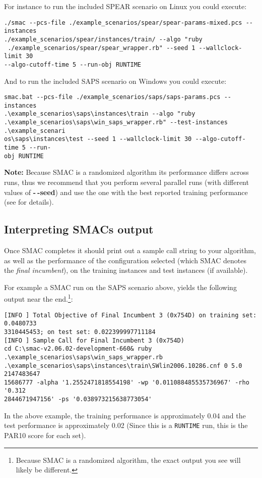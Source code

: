\documentclass[11pt,letterpaper,twoside]{article}
\begin{document}
For instance to run the included SPEAR scenario on Linux you could execute:

\begin{verbatim}
./smac --pcs-file ./example_scenarios/spear/spear-params-mixed.pcs --instances
./example_scenarios/spear/instances/train/ --algo "ruby 
 ./example_scenarios/spear/spear_wrapper.rb" --seed 1 --wallclock-limit 30
--algo-cutoff-time 5 --run-obj RUNTIME
\end{verbatim}

And to run the included SAPS scenario on Windows you could execute:

\begin{verbatim}
smac.bat --pcs-file ./example_scenarios/saps/saps-params.pcs --instances 
.\example_scenarios\saps\instances\train --algo "ruby
.\example_scenarios\saps\win_saps_wrapper.rb" --test-instances .\example_scenari
os\saps\instances\test --seed 1 --wallclock-limit 30 --algo-cutoff-time 5 --run-
obj RUNTIME 
\end{verbatim}

\textbf{Note:} Because SMAC is a randomized algorithm its performance differs across runs, thus we recommend that you perform several parallel runs (with different values of \textbf{-$~\!$-seed}) and use the one with the best reported training performance (see \cite{HutHooLey12-ParallelAC} for details).

\subsection{Interpreting SMACs output}

Once SMAC completes it should print out a sample call string to your algorithm, as well as
the performance of the configuration selected (which SMAC denotes the \emph{final incumbent}), on the training instances and test instances (if available).

For example a SMAC run on the SAPS scenario above, yields the following output near the end.\footnote{Because SMAC is a randomized algorithm, the exact output you see will likely be different.}:
\begin{verbatim}
[INFO ] Total Objective of Final Incumbent 3 (0x754D) on training set: 0.0480733
3310445453; on test set: 0.022399997711184
[INFO ] Sample Call for Final Incumbent 3 (0x754D)
cd C:\smac-v2.06.02-development-660& ruby .\example_scenarios\saps\win_saps_wrapper.rb
.\example_scenarios\saps\instances\train\SWlin2006.10286.cnf 0 5.0 2147483647
15686777 -alpha '1.2552471818554198' -wp '0.011088485535736967' -rho '0.312
2844671947156' -ps '0.038973215638773054'
\end{verbatim}
In the above example, the training performance is approximately 0.04 and the test performance is approximately 0.02 (Since this is a \texttt{RUNTIME} run, this is the PAR10 score for each set).
\end{document}
